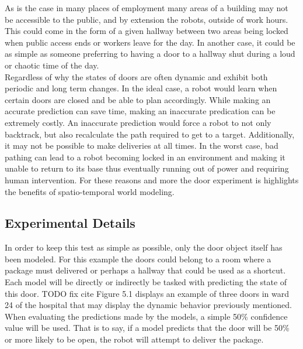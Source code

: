   As is the case in many places of employment many areas of a building may not
  be accessible to the public, and by extension the robots, outside of work
  hours. This could come in the form of a given hallway between two areas being
  locked when public access ends or workers leave for the day. In another case, it could be as
  simple as someone preferring to having a door to a hallway shut during a loud
  or chaotic time of the day. \\

  Regardless of why the states of doors are often
  dynamic and exhibit both periodic and long term changes. In the ideal case, a robot
  would learn when certain doors are closed and be able to plan accordingly.
  While making an accurate prediction can save time, making an inaccurate
  predication can be extremely costly. An inaccurate prediction would force a robot
  to not only backtrack, but also recalculate the path required to get to a
  target. Additionally, it may not be possible to make deliveries at all times.
  In the worst case, bad pathing can lead to a robot becoming locked in an
  environment and making it unable to return to its base thus eventually running out of power and
  requiring human intervention. For these reasons and more the door
  experiment is highlights the benefits of spatio-temporal world
  modeling. \\

  \subsection{ Experimental Details }

  In order to keep this test as simple as possible, only the door
  object itself has been modeled. For this example the doors could belong to a room where a
  package must delivered or perhaps a hallway that could be used as a
  shortcut. Each model will be directly or indirectly be tasked with
  predicting the state of this door. TODO fix cite Figure 5.1 displays an example of three
  doors in ward 24 of the hospital that may display the dynamic behavior
  previously mentioned. \\

  When evaluating the predictions made by the models, a simple 50\% confidence
  value will be used. That is to say, if a model predicts that the door will
  be 50\% or more likely to be open, the robot will attempt to
  deliver the package. \\

